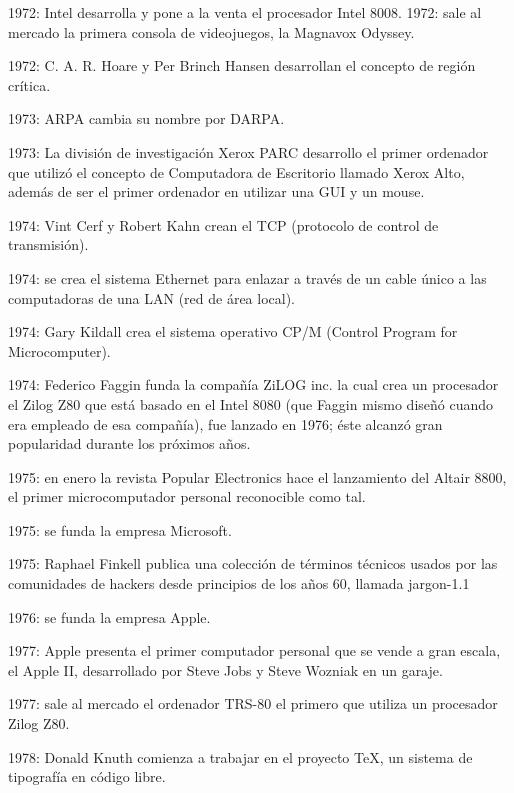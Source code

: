 \documentclass{article}
\begin{document}
{    \item 1972: Intel desarrolla y pone a la venta el procesador Intel 8008.
    1972: sale al mercado la primera consola de videojuegos, la Magnavox Odyssey.
    \item 1972: C. A. R. Hoare y Per Brinch Hansen desarrollan el concepto de región crítica.
    \item 1973: ARPA cambia su nombre por DARPA.
    \item 1973: La división de investigación Xerox PARC desarrollo el primer ordenador que utilizó el concepto de Computadora de Escritorio llamado Xerox Alto, además de ser el primer ordenador en utilizar una GUI y un mouse.
    \item 1974: Vint Cerf y Robert Kahn crean el TCP (protocolo de control de transmisión).
    \item 1974: se crea el sistema Ethernet para enlazar a través de un cable único a las computadoras de una LAN (red de área local).
    \item 1974: Gary Kildall crea el sistema operativo CP/M (Control Program for Microcomputer).
    \item 1974: Federico Faggin funda la compañía ZiLOG inc. la cual crea un procesador el Zilog Z80 que está basado en el Intel 8080 (que Faggin mismo diseñó cuando era empleado de esa compañía), fue lanzado en 1976; éste alcanzó gran popularidad durante los próximos años.
    \item 1975: en enero la revista Popular Electronics hace el lanzamiento del Altair 8800, el primer microcomputador personal reconocible como tal.
    \item 1975: se funda la empresa Microsoft.
    \item 1975: Raphael Finkell publica una colección de términos técnicos usados por las comunidades de hackers desde principios de los años 60, llamada jargon-1.1​
    \item 1976: se funda la empresa Apple.
    \item 1977: Apple presenta el primer computador personal que se vende a gran escala, el Apple II, desarrollado por Steve Jobs y Steve Wozniak en un garaje.
    \item 1977: sale al mercado el ordenador TRS-80 el primero que utiliza un procesador Zilog Z80.
    \item 1978: Donald Knuth comienza a trabajar en el proyecto TeX, un sistema de tipografía en código libre.
}
\end{document}
